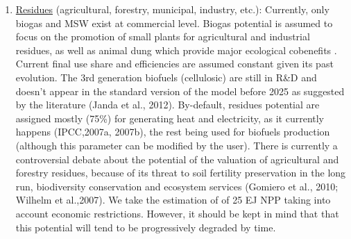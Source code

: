\begin{enumerate}
    \item \underline{Residues} (agricultural, forestry, municipal, industry, etc.): Currently, only biogas and MSW exist at commercial level. Biogas potential is assumed to focus on the promotion of small plants for agricultural and industrial residues, as well as animal dung which provide major ecological cobenefits \cite{WBGU2009}. Current final use share and efficiencies are assumed constant given its past evolution. The 3rd generation biofuels (cellulosic) are still in R\&D and doesn’t appear in the standard version of the model before 2025 as suggested by the literature (Janda et al., 2012). By-default, residues potential are assigned mostly (75\%) for generating heat and electricity, as it currently happens (IPCC,2007a, 2007b), the rest being used for biofuels production (although this parameter can be modified by the user). There is currently a controversial debate about the potential of the valuation of agricultural and forestry residues, because of its threat to soil fertility preservation in the long run, biodiversity conservation and ecosystem services (Gomiero et al., 2010; Wilhelm et al.,2007). We take the estimation of \cite{WBGU2009} of 25 EJ NPP taking into account economic restrictions. However, it should be kept in mind that that this potential will tend to be progressively degraded by time.
\end{enumerate}



